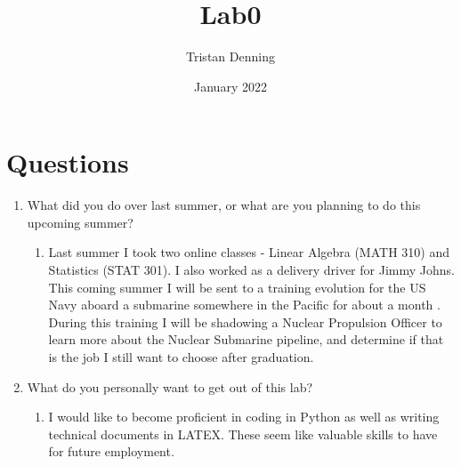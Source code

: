 \documentclass{article}
\title{Lab0}
\author{Tristan Denning}
\date{January 2022}
\begin{document}
\maketitle

\section{Questions}
\begin{enumerate}
    \item What did you do over last summer, or what are you planning to do this upcoming summer?
        \begin{enumerate}
            \item Last summer I took two online classes - Linear Algebra (MATH 310) and Statistics (STAT 301). I also worked as a delivery driver for Jimmy Johns. This coming summer I will be sent to a training evolution for the US Navy aboard a submarine somewhere in the Pacific for about a month . During this training I will be shadowing a Nuclear Propulsion Officer to learn more about the Nuclear Submarine pipeline, and determine if that is the job I still want to choose after graduation. 
        \end{enumerate}
        \item What do you personally want to get out of this lab?
        \begin{enumerate}
            \item I would like to become proficient in coding in Python as well as writing technical documents in LATEX. These seem like valuable skills to have for future employment.
        \end{enumerate}
\end{enumerate}
\end{document}
